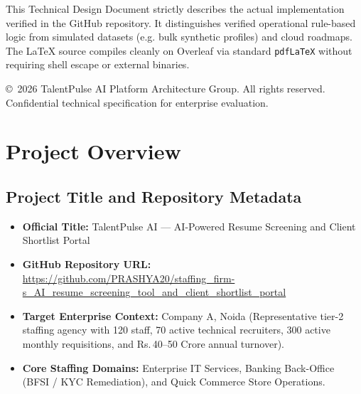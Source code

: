 \documentclass[11pt,a4paper,oneside]{report}
\newcommand{\INR}{\textsf{Rs.\,}}
\begin{document}
\begin{titlepage}
    \vspace{1.5cm}
    \begin{archnote}
    This Technical Design Document strictly describes the actual implementation verified in the GitHub repository. It distinguishes verified operational rule-based logic from simulated datasets (e.g. bulk synthetic profiles) and cloud roadmaps. The LaTeX source compiles cleanly on Overleaf via standard \texttt{pdfLaTeX} without requiring shell escape or external binaries.
    \end{archnote}
    
    \vfill
    {\noindent\footnotesize\color{textmuted}\textsf{\copyright~2026 TalentPulse AI Platform Architecture Group. All rights reserved. Confidential technical specification for enterprise evaluation.}}
\end{titlepage}

\newpage
{}
\tableofcontents
\newpage
{}
\setcounter{page}{1}

\chapter{Project Overview}

\section{Project Title and Repository Metadata}
\begin{itemize}[leftmargin=1.5em]
    \item \textbf{Official Title:} TalentPulse AI --- AI-Powered Resume Screening and Client Shortlist Portal
    \item \textbf{GitHub Repository URL:} \href{https://github.com/PRASHYA20/staffing_firm-s_AI_resume_screening_tool_and_client_shortlist_portal}{https://github.com/PRASHYA20/staffing\_firm-s\_AI\_resume\_screening\_tool\_and\_client\_shortlist\_portal}
    \item \textbf{Target Enterprise Context:} Company A, Noida (Representative tier-2 staffing agency with 120 staff, 70 active technical recruiters, 300 active monthly requisitions, and \INR 40--50 Crore annual turnover).
    \item \textbf{Core Staffing Domains:} Enterprise IT Services, Banking Back-Office (BFSI / KYC Remediation), and Quick Commerce Store Operations.
\end{itemize}
\end{document}
